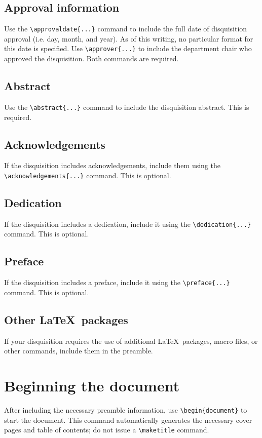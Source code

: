 \documentclass{article}
\begin{document}
\subsection{Approval information}
Use the \texttt{\textbackslash approvaldate\{...\}} command to include the full date of disquisition approval (i.e. day, month, and year). As of this writing, no particular format for this date is specified. Use \texttt{\textbackslash approver\{...\}} to include the department chair who approved the disquisition. Both commands are required.

\subsection{Abstract}
Use the \texttt{\textbackslash abstract\{...\}} command to include the disquisition abstract. This is required.

\subsection{Acknowledgements}
If the disquisition includes acknowledgements, include them using the \texttt{\textbackslash acknowledgements\{...\}} command. This is optional.

\subsection{Dedication}
If the disquisition includes a dedication, include it using the \texttt{\textbackslash dedication\{...\}} command. This is optional.

\subsection{Preface}
If the disquisition includes a preface, include it using the \texttt{\textbackslash preface\{...\}} command. This is optional.

\subsection{Other \LaTeX\ packages}
If your disquisition requires the use of additional \LaTeX\ packages, macro files, or other commands, include them in the preamble.

\section{Beginning the document}
After including the necessary preamble information, use \texttt{\textbackslash begin\{document\}} to start the document. This command automatically generates the necessary cover pages and table of contents; do not issue a \texttt{\textbackslash maketitle} command.
\end{document}
